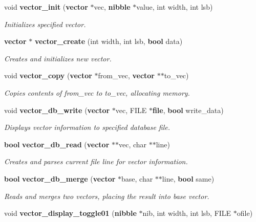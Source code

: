 \begin{CompactItemize}
\item 
void {\bf vector\_\-init} ({\bf vector} $\ast$vec, {\bf nibble} $\ast$value, int width, int lsb)
\begin{CompactList}\small\item\em Initializes specified vector. \item\end{CompactList}\item 
{\bf vector} $\ast$ {\bf vector\_\-create} (int width, int lsb, {\bf bool} data)
\begin{CompactList}\small\item\em Creates and initializes new vector. \item\end{CompactList}\item 
void {\bf vector\_\-copy} ({\bf vector} $\ast$from\_\-vec, {\bf vector} $\ast$$\ast$to\_\-vec)
\begin{CompactList}\small\item\em Copies contents of from\_\-vec to to\_\-vec, allocating memory. \item\end{CompactList}\item 
void {\bf vector\_\-db\_\-write} ({\bf vector} $\ast$vec, FILE $\ast${\bf file}, {\bf bool} write\_\-data)
\begin{CompactList}\small\item\em Displays vector information to specified database file. \item\end{CompactList}\item 
{\bf bool} {\bf vector\_\-db\_\-read} ({\bf vector} $\ast$$\ast$vec, char $\ast$$\ast$line)
\begin{CompactList}\small\item\em Creates and parses current file line for vector information. \item\end{CompactList}\item 
{\bf bool} {\bf vector\_\-db\_\-merge} ({\bf vector} $\ast$base, char $\ast$$\ast$line, {\bf bool} same)
\begin{CompactList}\small\item\em Reads and merges two vectors, placing the result into base vector. \item\end{CompactList}\item 
void {\bf vector\_\-display\_\-toggle01} ({\bf nibble} $\ast$nib, int width, int lsb, FILE $\ast$ofile)

\end{CompactItemize}
